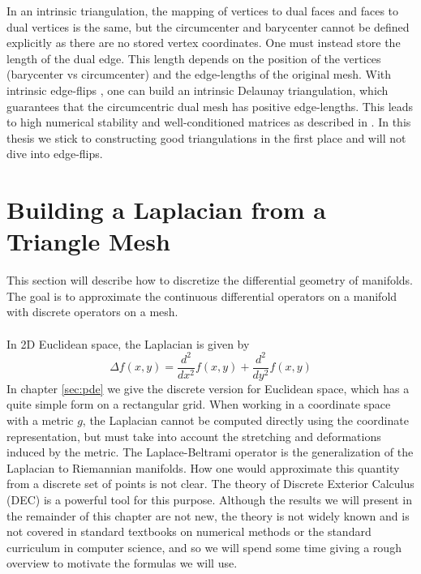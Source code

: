 In an intrinsic triangulation, the mapping of vertices to dual faces and faces to dual vertices is the same, but the circumcenter and barycenter cannot be defined explicitly as there are no stored vertex coordinates. One must instead store the length of the dual edge. This length depends on the position of the vertices (barycenter vs circumcenter) and the edge-lengths of the original mesh. With intrinsic edge-flips \cite{sharp2021intrinsic}, one can build an intrinsic Delaunay triangulation, which guarantees that the circumcentric dual mesh has positive edge-lengths. This leads to high numerical stability and well-conditioned matrices as described in \cite{intrinsic_laplacian}. In this thesis we stick to constructing good triangulations in the first place and will not dive into edge-flips.


\section*{Building a Laplacian from a Triangle Mesh}
This section will describe how to discretize the differential geometry of manifolds. The goal is to approximate the continuous differential operators on a manifold with discrete operators on a mesh.
\\\\
In 2D Euclidean space, the Laplacian is given by $$\Delta f(x, y) = \frac{d^2}{dx^2}f(x,y) + \frac{d^2}{dy^2}f(x,y)$$ In chapter \ref{sec:pde} we give the discrete version for Euclidean space, which has a quite simple form on a rectangular grid. When working in a coordinate space with a metric $g$, the Laplacian cannot be computed directly using the coordinate representation, but must take into account the stretching and deformations induced by the metric. The Laplace-Beltrami operator is the generalization of the Laplacian to Riemannian manifolds.
How one would approximate this quantity from a discrete set of points is not clear. The theory of Discrete Exterior Calculus (DEC) is a powerful tool for this purpose. Although the results we will present in the remainder of this chapter are not new, the theory is not widely known and is not covered in standard textbooks on numerical methods or the standard curriculum in computer science, and so we will spend some time giving a rough overview to motivate the formulas we will use.

